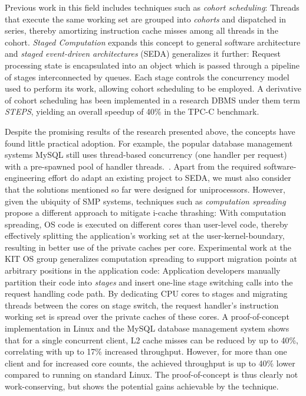 \documentclass[12pt,a4paper]{book}
\begin{document}
Previous work in this field includes techniques such as \emph{cohort scheduling}:
Threads that execute the same working set are grouped into \emph{cohorts} and dispatched in series, thereby amortizing instruction cache misses among all threads in the cohort.
\emph{Staged Computation} expands this concept to general software architecture and \emph{staged event-driven architectures} (SEDA) generalizes it further:
Request processing state is encapsulated into an object which is passed through a pipeline of stages interconnected by queues.
Each stage controls the concurrency model used to perform its work, allowing cohort scheduling to be employed.
A derivative of cohort scheduling has been implemented in a research DBMS under them term \emph{STEPS}, yielding an overall speedup of 40\% in the TPC-C benchmark.\cite{cohort,seda,steps,harizopoulos2005staged}

Despite the promising results of the research presented above, the concepts have found little practical adoption.
For example, the popular database management systems MySQL still uses thread-based concurrency (one handler per request) with a pre-spawned pool of handler threads.~\cite{mysqlThreading}.
Apart from the required software-engineering effort do adapt an existing project to SEDA, we must also consider that the solutions mentioned so far were designed for uniprocessors.
However, given the ubiquity of SMP systems, techniques such as \emph{computation spreading} propose a different approach to mitigate i-cache thrashing:
With computation spreading, OS code is executed on different cores than user-level code, thereby effectively splitting the application's working set at the user-kernel-boundary, resulting in better use of the private caches per core.
Experimental work at the KIT OS group generalizes computation spreading to support migration points at arbitrary positions in the application code:
Application developers manually partition their code into \emph{stages} and insert one-line stage switching calls into the request handling code path.
By dedicating CPU cores to stages and migrating threads between the cores on stage switch, the request handler's instruction working set is spread over the private caches of these cores.
A proof-of-concept implementation in Linux and the MySQL database management system shows that for a single concurrent client, L2 cache misses can be reduced by up to 40\%, correlating with up to 17\% increased throughput.
However, for more than one client and for increased core counts, the achieved throughput is up to 40\% lower compared to running on standard Linux.
The proof-of-concept is thus clearly not work-conserving, but shows the potential gains achievable by the technique.
\end{document}
